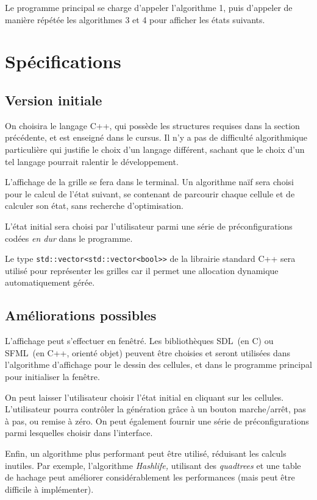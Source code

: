Le programme principal se charge d'appeler l'algorithme 1, puis
d'appeler de manière répétée les algorithmes 3 et 4 pour afficher
les états suivants.

\section{Spécifications}

\subsection{Version initiale}

On choisira le langage C++, qui possède les structures requises dans
la section précédente, et est enseigné dans le cursus. Il n'y a pas de difficulté
algorithmique particulière qui justifie le choix d'un langage différent,
sachant que le choix d'un tel langage pourrait ralentir le développement.

L'affichage de la grille se fera dans le terminal. Un algorithme
naïf sera choisi pour le calcul de l'état suivant, se contenant de parcourir
chaque cellule et de calculer son état, sans recherche d'optimisation.

L'état initial sera choisi par l'utilisateur parmi une série de
préconfigurations codées \emph{en dur} dans le programme.

Le type \texttt{std::vector<std::vector<bool>\null>} de la librairie
standard C++ sera utilisé pour représenter les grilles car il permet
une allocation dynamique automatiquement gérée.

\subsection{Améliorations possibles}

L'affichage peut s'effectuer en fenêtré. Les bibliothèques
SDL~(en C) ou SFML~(en C++, orienté objet) peuvent être choisies
et seront utilisées dans l'algorithme d'affichage pour le dessin
des cellules, et dans le programme principal pour initialiser la fenêtre.

On peut laisser l'utilisateur choisir l'état initial en cliquant
sur les cellules. L'utilisateur pourra contrôler la génération grâce
à un bouton marche/arrêt, pas à pas, ou remise à zéro. On peut
également fournir une série de préconfigurations parmi lesquelles choisir
dans l'interface.

Enfin, un algorithme plus performant peut être utilisé, réduisant
les calculs inutiles. Par exemple, l'algorithme \emph{Hashlife,}
\cite{gof-hashlife}
utilisant des \emph{quadtrees} et une table de hachage peut améliorer
considérablement les performances (mais peut être difficile à implémenter).

